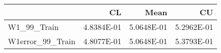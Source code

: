 \begin{tabular}{lrrr}
\toprule
{} &         CL &       Mean &         CU \\
\midrule
W1\_99\_Train      & 4.8384E-01 & 5.0648E-01 & 5.2962E-01 \\
W1error\_99\_Train & 4.8077E-01 & 5.0648E-01 & 5.3793E-01 \\
\bottomrule
\end{tabular}
